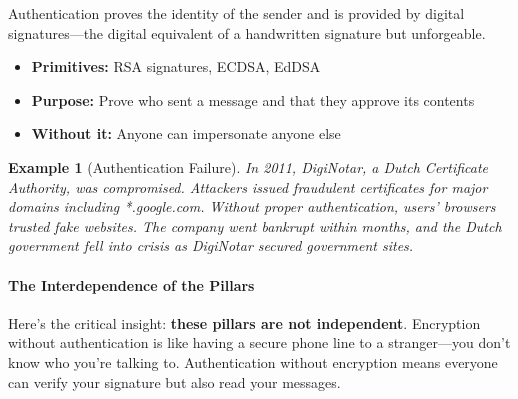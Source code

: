 \documentclass[11pt,a4paper]{article}
\newtheorem{example}{Example}
\begin{document}
Authentication proves the identity of the sender and is provided by digital signatures---the digital equivalent of a handwritten signature but unforgeable.

\begin{itemize}
    \item \textbf{Primitives:} RSA signatures, ECDSA, EdDSA
    \item \textbf{Purpose:} Prove who sent a message and that they approve its contents
    \item \textbf{Without it:} Anyone can impersonate anyone else
\end{itemize}

\begin{example}[Authentication Failure]
In 2011, DigiNotar, a Dutch Certificate Authority, was compromised. Attackers issued fraudulent certificates for major domains including *.google.com. Without proper authentication, users' browsers trusted fake websites. The company went bankrupt within months, and the Dutch government fell into crisis as DigiNotar secured government sites.
\end{example}

\paragraph{The Interdependence of the Pillars}

Here's the critical insight: \textbf{these pillars are not independent}. Encryption without authentication is like having a secure phone line to a stranger---you don't know who you're talking to. Authentication without encryption means everyone can verify your signature but also read your messages.
\end{document}
